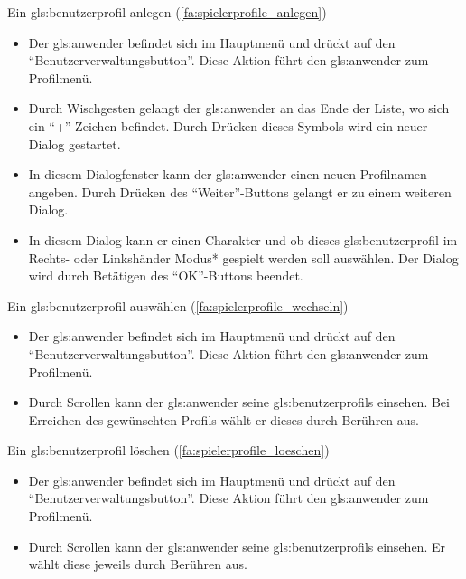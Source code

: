 \documentclass{scrartcl}
\begin{document}
\begin{telist}
	\item Ein \gls{gls:benutzerprofil} anlegen (\ref{fa:spielerprofile_anlegen})
	\begin{itemize}
		\item Der \gls{gls:anwender} befindet sich im Hauptmenü und drückt auf den \enquote{Benutzerverwaltungsbutton}. Diese Aktion führt den \gls{gls:anwender} zum Profilmenü.
		\item Durch Wischgesten gelangt der \gls{gls:anwender} an das Ende der Liste, wo sich ein \enquote{+}-Zeichen befindet. Durch Drücken dieses Symbols wird ein neuer Dialog gestartet.
		\item In diesem Dialogfenster kann der \gls{gls:anwender} einen neuen Profilnamen angeben. Durch Drücken des \enquote{Weiter}-Buttons gelangt er zu einem weiteren Dialog.
		\item In diesem Dialog kann er einen Charakter und ob dieses \gls{gls:benutzerprofil} im Rechts- oder Linkshänder Modus* gespielt werden soll auswählen. Der Dialog wird durch Betätigen des \enquote{OK}-Buttons beendet.
	\end{itemize}
	
	\item Ein \gls{gls:benutzerprofil} auswählen (\ref{fa:spielerprofile_wechseln})
	\begin{itemize}
		\item Der \gls{gls:anwender} befindet sich im Hauptmenü und drückt auf den \enquote{Benutzerverwaltungsbutton}. Diese Aktion führt den \gls{gls:anwender} zum Profilmenü.
		\item Durch Scrollen kann der \gls{gls:anwender} seine \glspl{gls:benutzerprofil} einsehen. Bei Erreichen des gewünschten Profils wählt er dieses durch Berühren aus.
	\end{itemize}
	
	\item Ein \gls{gls:benutzerprofil} löschen (\ref{fa:spielerprofile_loeschen})
	\begin{itemize}
		\item Der \gls{gls:anwender} befindet sich im Hauptmenü und drückt auf den \enquote{Benutzerverwaltungsbutton}. Diese Aktion führt den \gls{gls:anwender} zum Profilmenü.
		\item Durch Scrollen kann der \gls{gls:anwender} seine \glspl{gls:benutzerprofil} einsehen. Er wählt diese jeweils durch Berühren aus. 
	\end{itemize}
	

\end{telist}
\end{document}
